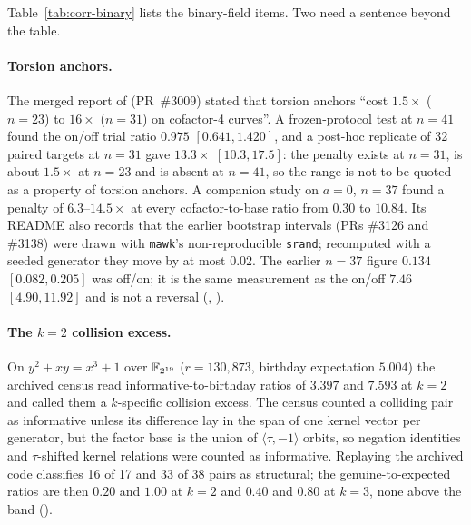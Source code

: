 Table~\ref{tab:corr-binary} lists the binary-field items. Two need a
sentence beyond the table.

\paragraph{Torsion anchors.} The merged report of
 (PR~\#3009) stated that torsion
anchors ``cost $1.5\times$ ($n=23$) to $16\times$ ($n=31$) on cofactor-4
curves''. A frozen-protocol test at $n=41$ found the on/off trial ratio
$0.975$ $[0.641,1.420]$, and a post-hoc replicate of 32 paired targets at
$n=31$ gave $13.3\times$ $[10.3,17.5]$: the penalty exists at $n=31$, is about
$1.5\times$ at $n=23$ and is absent at $n=41$, so the range is not to be
quoted as a property of torsion anchors. A companion study on $a=0$, $n=37$
found a penalty of $6.3$--$14.5\times$ at every cofactor-to-base ratio from
$0.30$ to $10.84$. Its README also records that the earlier bootstrap
intervals (PRs \#3126 and \#3138) were drawn with \texttt{mawk}'s
non-reproducible \texttt{srand}; recomputed with a seeded generator they move
by at most $0.02$. The earlier $n=37$ figure $0.134$ $[0.082,0.205]$ was
off/on; it is the same measurement as the on/off $7.46$ $[4.90,11.92]$ and is
not a reversal
(,
).

\paragraph{The $k=2$ collision excess.} On $y^2+xy=x^3+1$ over
$\mathbb{F}_{2^{19}}$ ($r=130{,}873$, birthday expectation $5.004$) the archived
census read informative-to-birthday ratios of $3.397$ and $7.593$ at $k=2$
and called them a $k$-specific collision excess. The census counted a
colliding pair as informative unless its difference lay in the span of one
kernel vector per generator, but the factor base is the union of
$\langle\tau,-1\rangle$ orbits, so negation identities and $\tau$-shifted
kernel relations were counted as informative. Replaying the archived code
classifies 16 of 17 and 33 of 38 pairs as structural; the genuine-to-expected
ratios are then $0.20$ and $1.00$ at $k=2$ and $0.40$ and $0.80$ at $k=3$, none
above the band
().

